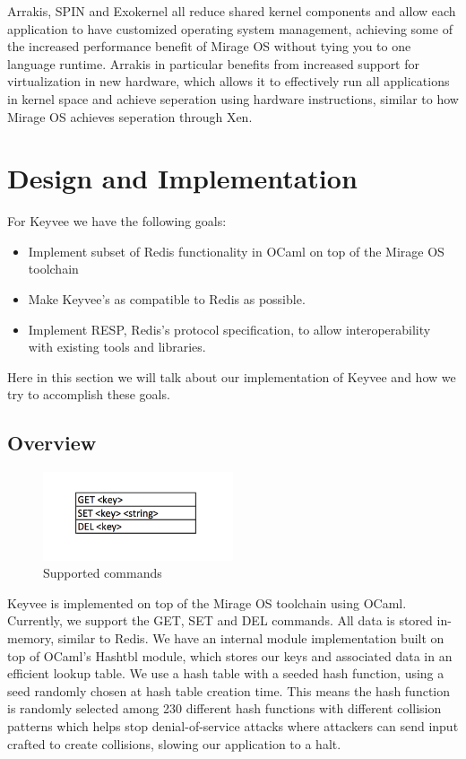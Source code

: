 \documentclass[english,10pt,twocolumn]{article}
\begin{document}
Arrakis\cite{arrakis}, SPIN\cite{spin} and Exokernel\cite{exokernel} all reduce shared kernel components and allow each application to have customized operating system management, achieving some of the increased performance benefit of Mirage OS without tying you to one language runtime.
Arrakis in particular benefits from increased support for virtualization in new hardware, which allows it to effectively run all applications in kernel space and achieve seperation using hardware instructions, similar to how Mirage OS achieves seperation through Xen.




\section{Design and Implementation}
For Keyvee we have the following goals:
\begin{itemize}
  \item Implement subset of Redis functionality in OCaml on top of the Mirage OS toolchain
  \item Make Keyvee's as compatible to Redis as possible.
  \item Implement RESP, Redis's protocol specification, to allow interoperability with existing tools and libraries.
\end{itemize}

Here in this section we will talk about our implementation of Keyvee and how we try to accomplish these goals.

\subsection{Overview}

\begin{figure}[ht]
  \centering
  \caption{Supported commands}
  \includegraphics[width=0.5\textwidth]{images/commands}
\end{figure}

Keyvee is implemented on top of the Mirage OS toolchain using OCaml.
Currently, we support the GET, SET and DEL commands.
All data is stored in-memory, similar to Redis.
We have an internal module implementation built on top of OCaml's Hashtbl module, which stores our keys and associated data in an efficient lookup table.
We use a hash table with a seeded hash function, using a seed randomly chosen at hash table creation time.
This means the hash function is randomly selected among 230 different hash functions with different collision patterns which helps stop denial-of-service attacks where attackers can send input crafted to create collisions, slowing our application to a halt.
\end{document}
